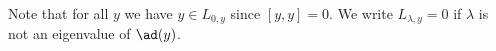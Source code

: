 Note that for all $y$ we have $y \in L_{0, y}$ since $[y, y] = 0$. We write
$L_{\lambda, y} = 0$ if $\lambda$ is not an eigenvalue of $\ad(y)$.
